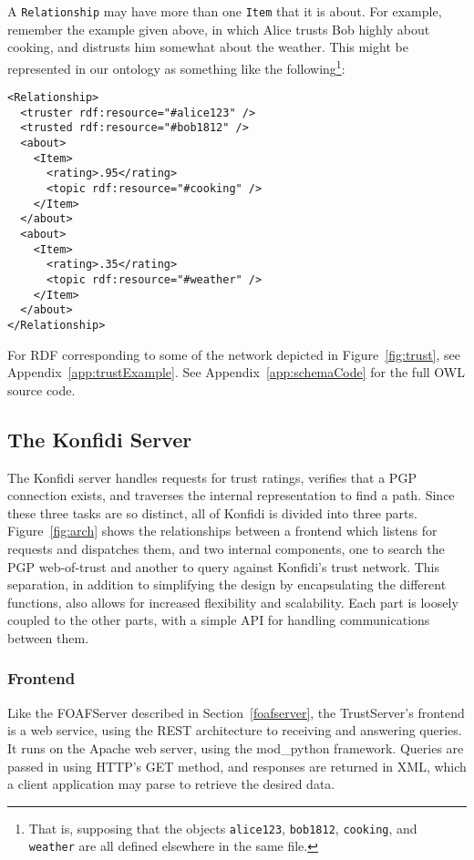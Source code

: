 \documentclass[letterpaper]{www2006-submission}
\begin{document}
A \texttt{Relationship} may have more than one \texttt{Item} that it is about.  For example, remember the example given above, in which Alice trusts Bob highly about cooking, and distrusts him somewhat about the weather.  This might be represented in our ontology as something like the following\footnote{That is, supposing that the objects \texttt{alice123}, \texttt{bob1812}, \texttt{cooking}, and \texttt{weather} are all defined elsewhere in the same file.}:

\begin{verbatim}
<Relationship>
  <truster rdf:resource="#alice123" />
  <trusted rdf:resource="#bob1812" />
  <about>
    <Item>
      <rating>.95</rating>
      <topic rdf:resource="#cooking" />
    </Item>
  </about>
  <about>
    <Item>
      <rating>.35</rating>
      <topic rdf:resource="#weather" />
    </Item>
  </about>
</Relationship>
\end{verbatim}

For RDF corresponding to some of the network depicted in Figure~\ref{fig:trust}, see Appendix~\ref{app:trustExample}.  See Appendix~\ref{app:schemaCode} for the full OWL source code.  

\subsection{The Konfidi Server}
The Konfidi server handles requests for trust ratings, verifies that a PGP connection exists, and traverses the internal representation to find a path.  Since these three tasks are so distinct, all of Konfidi is divided into three parts.  Figure~\ref{fig:arch} shows the relationships between a frontend which listens for requests and dispatches them, and two internal components, one to search the PGP web-of-trust and another to query against Konfidi's trust network.  This separation, in addition to simplifying the design by encapsulating the different functions, also allows for increased flexibility and scalability.  Each part is loosely coupled to the other parts, with a simple API for handling communications between them.

\subsubsection{Frontend}
Like the FOAFServer described in Section~\ref{foafserver}, the TrustServer's frontend is a web service, using the REST architecture to receiving and answering queries. 
It runs on the Apache web server, using the mod\_python framework.  Queries are passed in using HTTP's GET method, and responses are returned in XML, which a client application may parse to retrieve the desired data.
\end{document}
